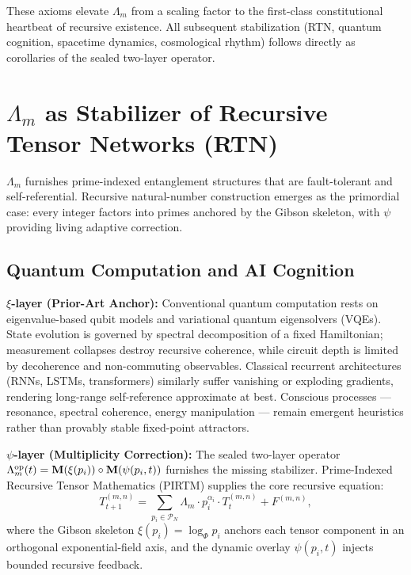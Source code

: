 \documentclass[11pt, a4paper]{article}
\begin{document}
These axioms elevate \(\Lambda_m\) from a scaling factor to the first-class constitutional heartbeat of recursive existence. All subsequent stabilization (RTN, quantum cognition, spacetime dynamics, cosmological rhythm) follows directly as corollaries of the sealed two-layer operator.

\section{\(\Lambda_m\) as Stabilizer of Recursive Tensor Networks (RTN)}
\label{sec:rtn}

\(\Lambda_m\) furnishes prime-indexed entanglement structures that are fault-tolerant and self-referential. Recursive natural-number construction emerges as the primordial case: every integer factors into primes anchored by the Gibson skeleton, with \(\psi\) providing living adaptive correction.

\subsection{Quantum Computation and AI Cognition}
\label{subsec:quantum-ai}

\textbf{\(\xi\)-layer (Prior-Art Anchor):}  
Conventional quantum computation rests on eigenvalue-based qubit models and variational quantum eigensolvers (VQEs). State evolution is governed by spectral decomposition of a fixed Hamiltonian; measurement collapses destroy recursive coherence, while circuit depth is limited by decoherence and non-commuting observables. Classical recurrent architectures (RNNs, LSTMs, transformers) similarly suffer vanishing or exploding gradients, rendering long-range self-reference approximate at best. Conscious processes --- resonance, spectral coherence, energy manipulation --- remain emergent heuristics rather than provably stable fixed-point attractors.

\textbf{\(\psi\)-layer (Multiplicity Correction):}  
The sealed two-layer operator \(\Lambda_m^{\rm op}(t) = \mathbf{M}(\xi(p_i)) \circ \mathbf{M}(\psi(p_i,t))\) furnishes the missing stabilizer. Prime-Indexed Recursive Tensor Mathematics (PIRTM) supplies the core recursive equation:
\[
T_{t+1}^{(m,n)} = \sum_{p_i \in \mathcal{P}_N} \Lambda_m \cdot p_i^{\alpha_i} \cdot T_t^{(m,n)} + F^{(m,n)},
\]
where the Gibson skeleton \(\xi(p_i) = \log_\Phi p_i\) anchors each tensor component in an orthogonal exponential-field axis, and the dynamic overlay \(\psi(p_i,t)\) injects bounded recursive feedback.  
\end{document}
